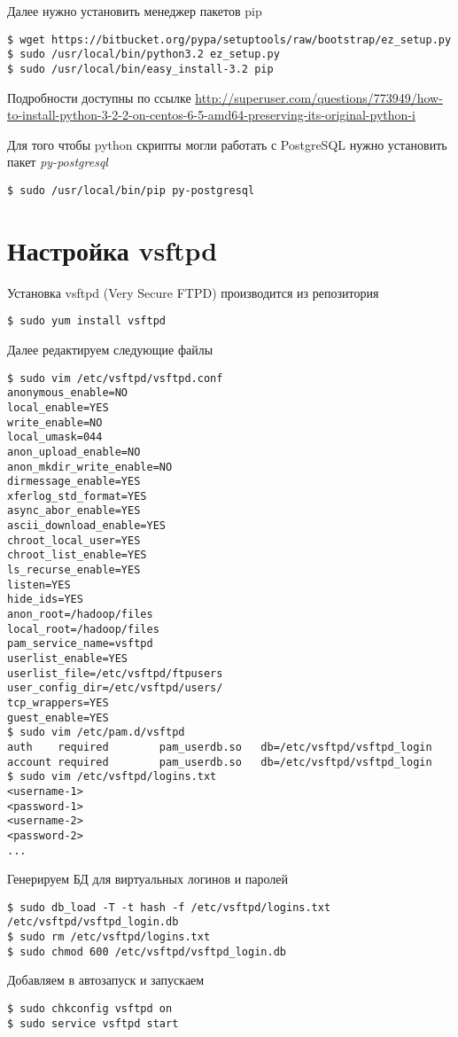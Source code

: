 Далее нужно установить менеджер пакетов pip
\begin{lstlisting}
$ wget https://bitbucket.org/pypa/setuptools/raw/bootstrap/ez_setup.py
$ sudo /usr/local/bin/python3.2 ez_setup.py
$ sudo /usr/local/bin/easy_install-3.2 pip
\end{lstlisting}
Подробности доступны по ссылке \url{http://superuser.com/questions/773949/how-to-install-python-3-2-2-on-centos-6-5-amd64-preserving-its-original-python-i}

Для того чтобы python скрипты могли работать с PostgreSQL нужно установить пакет \emph{py-postgresql}
\begin{lstlisting}
$ sudo /usr/local/bin/pip py-postgresql
\end{lstlisting}

\section{Настройка vsftpd}
Установка vsftpd (Very Secure FTPD) производится из репозитория
\begin{lstlisting}
$ sudo yum install vsftpd
\end{lstlisting}
Далее редактируем следующие файлы
\begin{lstlisting}
$ sudo vim /etc/vsftpd/vsftpd.conf
anonymous_enable=NO
local_enable=YES
write_enable=NO
local_umask=044
anon_upload_enable=NO
anon_mkdir_write_enable=NO
dirmessage_enable=YES
xferlog_std_format=YES
async_abor_enable=YES
ascii_download_enable=YES
chroot_local_user=YES
chroot_list_enable=YES
ls_recurse_enable=YES
listen=YES
hide_ids=YES
anon_root=/hadoop/files
local_root=/hadoop/files
pam_service_name=vsftpd
userlist_enable=YES
userlist_file=/etc/vsftpd/ftpusers
user_config_dir=/etc/vsftpd/users/
tcp_wrappers=YES
guest_enable=YES
$ sudo vim /etc/pam.d/vsftpd
auth    required        pam_userdb.so   db=/etc/vsftpd/vsftpd_login
account required        pam_userdb.so   db=/etc/vsftpd/vsftpd_login
$ sudo vim /etc/vsftpd/logins.txt
<username-1>
<password-1>
<username-2>
<password-2>
...
\end{lstlisting}

Генерируем БД для виртуальных логинов и паролей 
\begin{lstlisting}
$ sudo db_load -T -t hash -f /etc/vsftpd/logins.txt /etc/vsftpd/vsftpd_login.db
$ sudo rm /etc/vsftpd/logins.txt
$ sudo chmod 600 /etc/vsftpd/vsftpd_login.db
\end{lstlisting}

Добавляем в автозапуск и запускаем
\begin{lstlisting}
$ sudo chkconfig vsftpd on
$ sudo service vsftpd start
\end{lstlisting}

